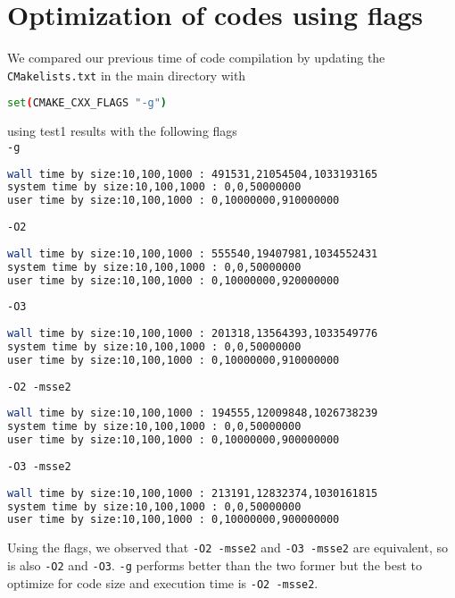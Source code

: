 \documentclass[11pt]{article}
\begin{document}
\section{Optimization of codes using flags}
We compared our previous time of code compilation by updating the \texttt{CMakelists.txt} in the main directory with \begin{lstlisting}[language={sh}]
set(CMAKE_CXX_FLAGS "-g")
\end{lstlisting} using test1 results with the following flags\\
\texttt{-g}
\begin{lstlisting}[language={sh}]
wall time by size:10,100,1000 : 491531,21054504,1033193165
system time by size:10,100,1000 : 0,0,50000000
user time by size:10,100,1000 : 0,10000000,910000000
\end{lstlisting}
\vspace{5mm}
\texttt{-O2}
\begin{lstlisting}[language={sh}]
wall time by size:10,100,1000 : 555540,19407981,1034552431
system time by size:10,100,1000 : 0,0,50000000
user time by size:10,100,1000 : 0,10000000,920000000
\end{lstlisting}
\vspace{5mm}
\texttt{-O3}
\begin{lstlisting}[language={sh}]
wall time by size:10,100,1000 : 201318,13564393,1033549776
system time by size:10,100,1000 : 0,0,50000000
user time by size:10,100,1000 : 0,10000000,910000000
\end{lstlisting}
\vspace{5mm}
\texttt{-O2 -msse2}
\begin{lstlisting}[language={sh}]
wall time by size:10,100,1000 : 194555,12009848,1026738239
system time by size:10,100,1000 : 0,0,50000000
user time by size:10,100,1000 : 0,10000000,900000000
\end{lstlisting}
\vspace{5mm}
\texttt{-O3 -msse2}
\begin{lstlisting}[language={sh}]
wall time by size:10,100,1000 : 213191,12832374,1030161815
system time by size:10,100,1000 : 0,0,50000000
user time by size:10,100,1000 : 0,10000000,900000000
\end{lstlisting}
Using the flags, we observed that \texttt{-O2 -msse2} and \texttt{-O3 -msse2} are equivalent, so is also \texttt{-O2} and \texttt{-O3}. \texttt{-g} performs better than the two former but the best to optimize for code size and execution time is \texttt{-O2 -msse2}.
\end{document}
